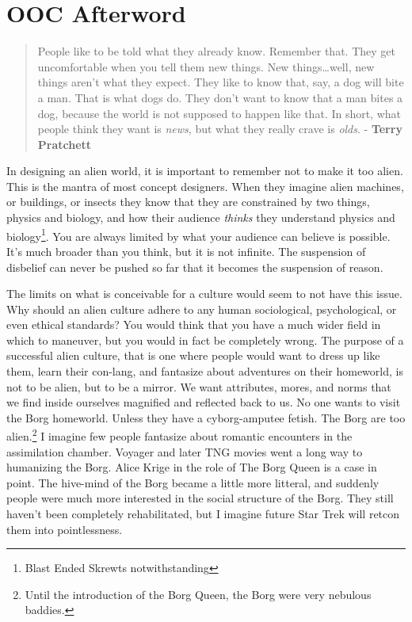 \chapter*{OOC Afterword }

\begin{quote}
People like to be told what they already know.  Remember that.  They get uncomfortable when you tell them new things.  New things…well, new things aren’t what they expect.  They like to know that, say, a dog will bite a man.  That is what dogs do.  They don’t want to know that a man bites a dog, because the world is not supposed to happen like that.  In short, what people think they want is \textit{news}, but what they really crave is \textit{olds}. - \textbf{Terry Pratchett}
\end{quote}

In designing an alien world, it is important to remember not to make it too alien. This is the mantra of most concept designers. When they imagine alien machines, or buildings, or insects they know that they are constrained by two things, physics and biology, and how their audience \textit{thinks} they understand physics and biology\footnote{Blast Ended Skrewts notwithstanding}. You are always limited by what your audience can believe is possible. It's much broader than you think, but it is not infinite. The suspension of disbelief can never be pushed so far that it becomes the suspension of reason.

The limits on what is conceivable for a culture would seem to not have this issue. Why should an alien culture adhere to any human sociological, psychological, or even ethical standards? You would think that you have a much wider field in which to maneuver, but you would in fact be completely wrong. The purpose of a successful alien culture, that is one where people would want to dress up like them, learn their con-lang, and fantasize about adventures on their homeworld, is not to be alien, but to be a mirror. We want attributes, mores, and norms that we find inside ourselves magnified and reflected back to us. No one wants to visit the Borg homeworld. Unless they have a cyborg-amputee fetish. The Borg are too alien.\footnote{Until the introduction of the Borg Queen, the Borg were very nebulous baddies.} I imagine few people fantasize about romantic encounters in the assimilation chamber. Voyager and later TNG movies went a long way to humanizing the Borg. Alice Krige in the role of The Borg Queen is a case in point. The hive-mind of the Borg became a little more litteral, and suddenly people were much more interested in the social structure of the Borg. They still haven't been completely rehabilitated, but I imagine future Star Trek will retcon them into pointlessness.

